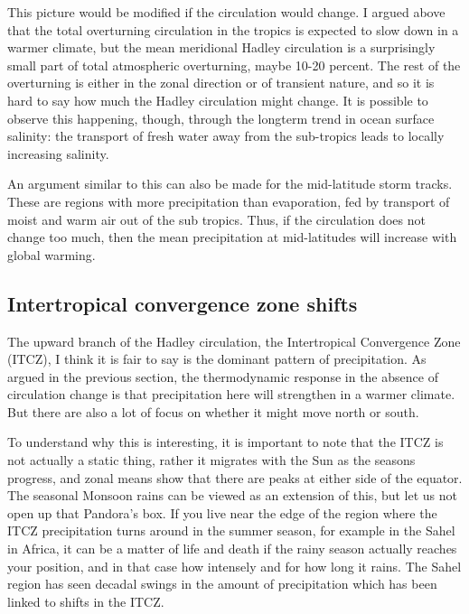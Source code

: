 \documentclass[12pt]{book}
\begin{document}
This picture would be modified if the circulation would change. I argued above that the total overturning circulation in the tropics is expected to slow down in a warmer climate, but the mean meridional Hadley circulation is a surprisingly small part of total atmospheric overturning, maybe 10-20 percent. The rest of the overturning is either in the zonal direction or of transient nature, and so it is hard to say how much the Hadley circulation might change. It is possible to observe this happening, though, through the longterm trend in ocean surface salinity: the transport of fresh water away from the sub-tropics leads to locally increasing salinity.

An argument similar to this can also be made for the mid-latitude storm tracks. These are regions with more precipitation than evaporation, fed by transport of moist and warm air out of the sub tropics. Thus, if the circulation does not change too much, then the mean precipitation at mid-latitudes will increase with global warming.

\subsection{Intertropical convergence zone shifts}
The upward branch of the Hadley circulation, the Intertropical Convergence Zone (ITCZ), I think it is fair to say is the dominant pattern of precipitation. As argued in the previous section, the thermodynamic response in the absence of circulation change is that precipitation here will strengthen in a warmer climate. But there are also a lot of focus on whether it might move north or south. 

To understand why this is interesting, it is important to note that the ITCZ is not actually a static thing, rather it migrates with the Sun as the seasons progress, and zonal means show that there are peaks at either side of the equator. The seasonal Monsoon rains can be viewed as an extension of this, but let us not open up that Pandora's box. If you live near the edge of the region where the ITCZ precipitation turns around in the summer season, for example in the Sahel in Africa, it can be a matter of life and death if the rainy season actually reaches your position, and in that case how intensely and for how long it rains. The Sahel region has seen decadal swings in the amount of precipitation which has been linked to shifts in the ITCZ.
\end{document}
